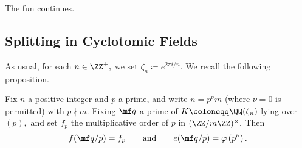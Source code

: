 \documentclass[../notes.tex]{subfiles}
\begin{document}














The fun continues.

\subsection{Splitting in Cyclotomic Fields}
As usual, for each $n\in\ZZ^+,$ we set $\zeta_n\coloneqq e^{2\pi i/n}.$ We recall the following proposition.
\begin{proposition}
	Fix $n$ a positive integer and $p$ a prime, and write $n=p^\nu m$ (where $\nu=0$ is permitted) with $p\nmid m.$ Fixing $\mf q$ a prime of $K\coloneqq \QQ(\zeta_n)$ lying over $(p),$ and set $f_p$ the multiplicative order of $p$ in $(\ZZ/m\ZZ)^\times.$ Then
	\[f(\mf q/p)=f_p\qquad\text{and}\qquad e(\mf q/p)=\varphi\left(p^\nu\right).\]
\end{proposition}
\end{document}
